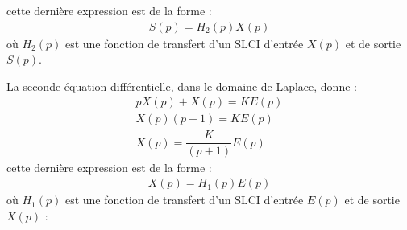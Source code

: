 cette dernière expression est de la forme :
\begin{align}
    S(p) = H_2(p) X(p)
    \label{eq-edo-h2}
\end{align}
où $H_2(p)$ est une fonction de transfert d'un SLCI d'entrée $X(p)$
et de sortie $S(p)$.
\begin{center}
\end{center}
La seconde équation différentielle, dans le domaine de Laplace, donne :
\begin{align*}
    pX(p)+X(p)=KE(p) \\
    X(p) (p+1) = KE(p) \\
    X(p) = \dfrac{K}{(p+1)} E(p)
\end{align*}
cette dernière expression est de la forme :
\begin{align}
X(p) = H_1(p) E(p)
\label{eq-edo-h1}
\end{align}
où $H_1(p)$ est une fonction de transfert d'un SLCI d'entrée $E(p)$
et de sortie $X(p)$ :
\begin{center}
\end{center}
